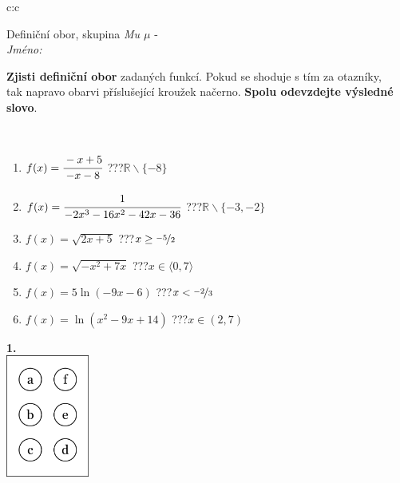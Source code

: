 \documentclass[10pt]{report}
\begin{document}
\begin{tabular}{c:c}
\begin{minipage}[c][104.5mm][t]{0.5\linewidth}
\begin{center}
\vspace{7mm}
{\huge Definiční obor, skupina \textit{Mu $\mu$} -}\\[5mm]
\textit{Jméno:}\phantom{xxxxxxxxxxxxxxxxxxxxxxxxxxxxxxxxxxxxxxxxxxxxxxxxxxxxxxxxxxxxxxxxx}\\[5mm]
\begin{minipage}{0.95\linewidth}
\begin{center}
\textbf{Zjisti definiční obor} zadaných funkcí. Pokud se shoduje s tím za otazníky,\\tak napravo obarvi příslušející kroužek načerno. \textbf{Spolu odevzdejte výsledné slovo}.
\end{center}
\end{minipage}
\\[1mm]
\begin{minipage}{0.79\linewidth}
\begin{center}
\begin{varwidth}{\linewidth}
\begin{enumerate}
\normalsizerrr
\item $f(x)=\cfrac{-x+5}{-x-8}$\quad \dotfill\; ???\;\dotfill \quad $\mathbb{R}\smallsetminus\{-8\}$
\item $f(x)=\cfrac{1}{-2x^3-16x^2-42x-36}$\quad \dotfill\; ???\;\dotfill \quad $\mathbb{R}\smallsetminus\{-3,-2\}$
\item $f(x)=\sqrt{2x+5}$\quad \dotfill\; ???\;\dotfill \quad $x\geq\nicefrac{-5}{2}$
\item $f(x)=\sqrt{-x^2+7x}$\quad \dotfill\; ???\;\dotfill \quad $x\in\langle0 , 7\rangle$
\item $f(x)=5\ln{(-9x-6)}$\quad \dotfill\; ???\;\dotfill \quad $x<\nicefrac{-2}{3}$
\item $f(x)=\ln{(x^2-9x+14)}$\quad \dotfill\; ???\;\dotfill \quad $x\in(2 , 7)$
\end{enumerate}
\end{varwidth}
\end{center}
\end{minipage}
\begin{minipage}{0.20\linewidth}
\begin{center}
{\Huge\bfseries 1.} \\[2mm]
\includegraphics[height=40mm]{../images/braille.png}

\end{center}
\end{minipage}
\end{center}
\end{minipage}
\end{tabular}
\end{document}
